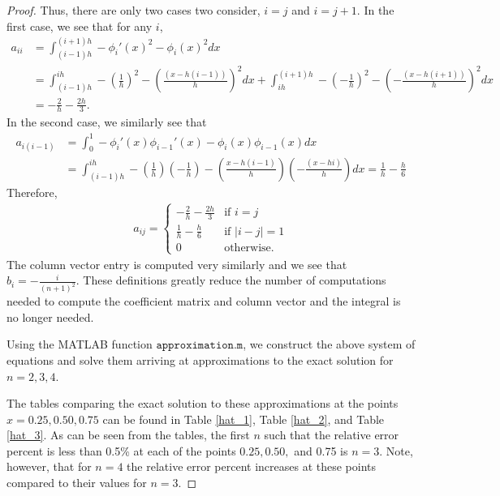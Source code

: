 \begin{proof}
  Thus, there are only two cases two consider, $i = j$ and $i = j + 1$.
  In the first case, we see that for any $i$,
  \begin{align*}
    a_{ii}
    &= \int_{(i-1)h}^{(i+1)h}-\phi_i'(x)^2 - \phi_i(x)^2 dx \\
    &= \int_{(i-1)h}^{ih} - \left(\frac{1}{h}\right)^2 - \left(\frac{(x - h(i-1))}{h}\right)^2 dx +
    \int_{ih}^{(i+1)h} - \left(-\frac{1}{h}\right)^2 - \left(-\frac{(x - h(i+1))}{h}\right)^2 dx \\
    &= - \frac{2}{h} - \frac{2h}{3}.
  \end{align*}
  In the second case, we similarly see that
  \begin{align*}
    a_{i(i-1)} &=
    \int_{0}^1 -\phi_{i}'(x)\phi_{i-1}'(x) - \phi_{i}(x)\phi_{i-1}(x) dx \\
    &= \int_{(i-1)h}^{ih} -\left(\frac{1}{h}\right)\left(-\frac{1}{h}\right) - \left(\frac{x - h(i-1)}{h}\right)\left(-\frac{(x - hi)}{h}\right)dx
    = \frac{1}{h} - \frac{h}{6}
  \end{align*}
  Therefore,
  \begin{align*}
    a_{ij} =
    \begin{cases}
      - \frac{2}{h} -\frac{2h}{3} & \text{if $i = j$} \\
      \frac{1}{h} - \frac{h}{6} & \text{if $|i - j| = 1$} \\
      0 & \text{otherwise}.
    \end{cases}
  \end{align*}
  The column vector entry is computed very similarly and we see that $b_i = -\frac{i}{(n+1)^2}$.
  These definitions greatly reduce the number of computations needed to compute the coefficient matrix
  and column vector and the integral is no longer needed.

  Using the MATLAB function $\texttt{approximation.m}$, we construct the above
  system of equations and solve them arriving at approximations to the exact
  solution for $n=2,3,4$.

  The tables comparing the exact solution to these approximations at the
  points $x=0.25, 0.50, 0.75$ can be found in Table \ref{hat_1}, Table \ref{hat_2}, and Table \ref{hat_3}.
  As can be seen from the tables, the first $n$ such that the
  relative error percent is less than 0.5\% at each of the points $0.25, 0.50, $ and 0.75
  is $n=3$. Note, however, that for $n=4$ the relative error percent increases at these
  points compared to their values for $n=3$.


\end{proof}
